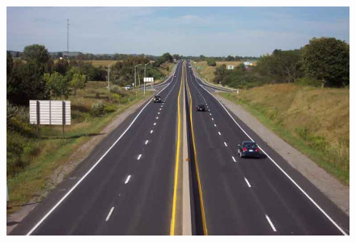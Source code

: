 \documentclass[a4paper, 10pt]{article}
\begin{document}
\begin{figure}[H]
\begin{minipage}{.4\textwidth}
\end{minipage}%
\begin{minipage}{.4\textwidth}
\centering
\includegraphics[scale=0.14]{inpainted_highway17.png}
\end{minipage}%
\end{figure}
\end{document}
